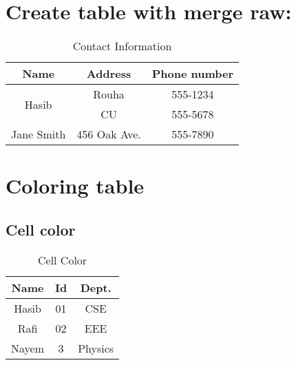 \documentclass{article}
\begin{document}


\section{Create table with merge raw:}


\begin{table}[h]
	\centering
	\begin{tabular}{|c|c|c|}
		\hline
		Name                   & Address      & Phone number \\ 
		\hline
		
		\multirow{2}{*}{Hasib} & Rouha         & 555-1234  \\
		
		 \cline{2-3}
		                        & CU           & 555-5678    
		                         \\ \hline
		Jane Smith             & 456 Oak Ave.  & 555-7890    
		 \\ \hline
	\end{tabular}
	\caption{Contact Information}
\end{table}


	
	\section{Coloring table}   %
	\subsection{Cell color}
	
	\begin{table}[htp]
		\centering
		\begin{tabular}{|c|c|c|}
			\hline
		\cellcolor{red!20}	Name & Id & Dept.\\
			\hline
			Hasib &01 & CSE\\
			\hline
			Rafi &  \cellcolor{green!60}02 & EEE \\
			\hline
			Nayem & 3 & Physics \\
			\hline
		\end{tabular}
		\caption{Cell Color}
	\end{table}
\end{document}
